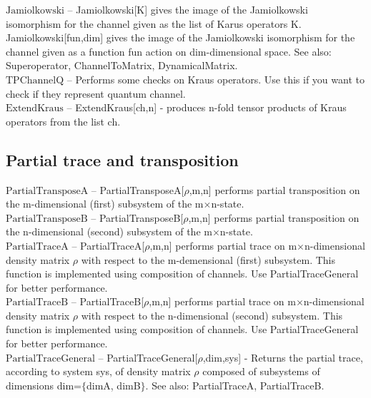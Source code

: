 \noindent\textbf{$ \text{Jamiolkowski} $ }-- Jamiolkowski[K] gives the image of the Jamiolkowski isomorphism for the channel given as the list of Karus operators K. Jamiolkowski[fun,dim] gives the image of the Jamiolkowski isomorphism for the channel given as a function fun action on dim-dimensional space. See also: Superoperator, ChannelToMatrix, DynamicalMatrix.$  $\\[6pt]

\noindent\textbf{$ \text{TPChannelQ} $ }-- Performs some checks on Kraus operators. Use this if you want to check if they represent quantum channel.$  $\\[6pt]

\noindent\textbf{$ \text{ExtendKraus} $ }-- ExtendKraus[ch,n] - produces n-fold tensor products of Kraus operators from the list ch.$  $\\[6pt]

\subsection{Partial trace and transposition}

\noindent\textbf{$ \text{PartialTransposeA} $ }-- PartialTransposeA[$\rho $,m,n] performs partial transposition on the m-dimensional (first) subsystem of the m$\times $n-state.$  $\\[6pt]

\noindent\textbf{$ \text{PartialTransposeB} $ }-- PartialTransposeB[$\rho $,m,n] performs partial transposition on the n-dimensional (second) subsystem of the m$\times $n-state.$  $\\[6pt]

\noindent\textbf{$ \text{PartialTraceA} $ }-- PartialTraceA[$\rho $,m,n] performs partial trace on m$\times $n-dimensional density matrix $\rho $ with respect to the m-demensional (first) subsystem. This function is implemented using composition of channels. Use PartialTraceGeneral for better performance.$  $\\[6pt]

\noindent\textbf{$ \text{PartialTraceB} $ }-- PartialTraceB[$\rho $,m,n] performs partial trace on m$\times $n-dimensional density matrix $\rho $ with respect to the n-dimensional (second) subsystem. This function is implemented using composition of channels. Use PartialTraceGeneral for better performance.$  $\\[6pt]

\noindent\textbf{$ \text{PartialTraceGeneral} $ }-- PartialTraceGeneral[$\rho $,dim,sys] - Returns the partial trace, according to system sys, of density matrix $\rho $ composed of subsystems of dimensions dim=$\{$dimA, dimB$\}$. See also: PartialTraceA, PartialTraceB.$  $\\[6pt]

